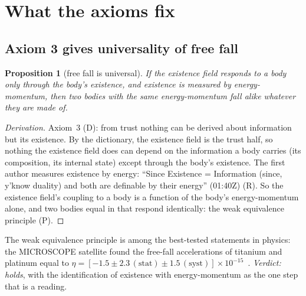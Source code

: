 \documentclass[11pt,a4paper]{article}
\newtheorem{proposition}{Proposition}
\theoremstyle{definition}
\theoremstyle{remark}
\newcommand{\tagD}{\textsf{(D)}}
\newcommand{\tagR}{\textsf{(R)}}
\newcommand{\tagP}{\textsf{(P)}}
\begin{document}
\section{What the axioms fix}\label{sec:derive}

\subsection{Axiom 3 gives universality of free fall}\label{sec:wep}

\begin{proposition}[free fall is universal]\label{pr:wep}
If the existence field responds to a body only through the body's existence, and existence is measured by energy-momentum, then two
bodies with the same energy-momentum fall alike whatever they are made of.
\end{proposition}

\begin{proof}[Derivation]
Axiom~3 \tagD: from trust nothing can be derived about information but its existence. By the dictionary, the existence field is the trust
half, so nothing the existence field does can depend on the information a body carries (its composition, its internal state) except
through the body's existence. The first author measures existence by energy: ``Since Existence = Information (since, y'know duality) and
both are definable by their energy'' (01:40Z) \tagR. So the existence field's coupling to a body is a function of the body's
energy-momentum alone, and two bodies equal in that respond identically: the weak equivalence principle \tagP.
\end{proof}

\noindent The weak equivalence principle is among the best-tested statements in physics: the MICROSCOPE satellite found the free-fall
accelerations of titanium and platinum equal to $\eta=[-1.5\pm2.3\,(\text{stat})\pm1.5\,(\text{syst})]\times10^{-15}$~\cite{microscope}.
\emph{Verdict: holds}, with the identification of existence with energy-momentum as the one step that is a reading.
\end{document}
